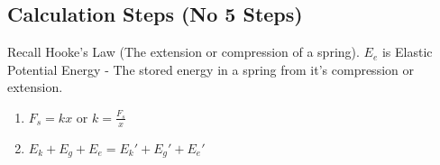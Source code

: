 \begin{adjustwidth}{1cm}{0pt}
    \subsection*{Calculation Steps (No 5 Steps)}
    \begin{flushleft}
        Recall Hooke's Law (The extension or compression of a spring). $E_{e}$ is Elastic Potential Energy - The stored energy in a spring from it's compression or extension.
    \end{flushleft}
    \vspace*{5pt}
    \begin{adjustwidth}{0.5cm}{0pt}
        \begin{enumerate}
            \item $F_{s} = kx$ or $k = \frac{F_{s}}{x}$
            \item $E_{k} + E_{g} + E_{e} = E_{k}\prime + E_{g}\prime + E_{e}\prime$
        \end{enumerate}
    \end{adjustwidth}
\end{adjustwidth}